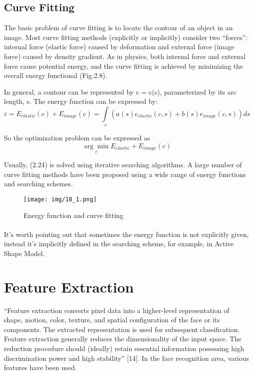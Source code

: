 \documentclass[12pt, twoside]{report}
\begin{document}
		\subsection{Curve Fitting}
		The basic problem of curve fitting is to locate the contour of an object in an image. Most
		curve fitting methods (explicitly or implicitly) consider two “forces”: internal force (elastic
		force) caused by deformation and external force (image force) caused by density gradient.
		As in physics, both internal force and external force cause potential energy, and the curve
		fitting is achieved by minimizing the overall energy functional (Fig.2.8).
		
		In general, a contour can be represented by c = c(s), parameterized by its arc length,
		s. The energy function can be expressed by:
		\begin{equation}
			\varepsilon = E_{elastic}(c) + E_{image}(c) = \int\limits_c (a(s)e_{elastic}(c,s) + b(s)e_{image}(c,s))ds
		\end{equation}
		
		So the optimization problem can be expressed as
		\begin{equation}
			\underset{c}{\arg\min}E_{elastic} + E_{image}(c)
		\end{equation}
		
		Usually, (2.24) is solved using iterative searching algorithms. A large number of curve
		fitting methods have been proposed using a wide range of energy functions and searching
		schemes.
	\newpage
	
	\begin{figure}[h!]
		\centering
	\texttt{[image: img/18\_1.png]}     
		\caption{Energy function and curve fitting}
		\label{fig:face}
	\end{figure}

	\paragraph{}
	It’s worth pointing out that sometimes the energy function is not explicitly given,
	instead it’s implicitly defined in the searching scheme, for example, in Active Shape Model.

	\section{Feature Extraction}
	“Feature extraction converts pixel data into a higher-level representation of shape, motion,
	color, texture, and spatial configuration of the face or its components. The extracted
	representation is used for subsequent classification. Feature extraction generally reduces
	the dimensionality of the input space. The reduction procedure should (ideally) retain
	essential information possessing high discrimination power and high stability” [14]. In the
	face recognition area, various features have been used.
\end{document}

